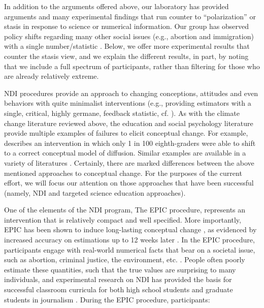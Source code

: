In addition to the arguments offered above, our laboratory has provided
arguments and many experimental findings that run counter to ``polarization'' or
stasis in response to science or numerical information.  Our group has observed
policy shifts regarding many other social issues (e.g., abortion and
immigration) with a single number/statistic
\parencite{garcia_de_osuna_qualitative_2004,munnich_policy_2003,ranney_designing_2008}.
Below, we offer more experimental results that counter the stasis view, and we
explain the different results, in part, by noting that we include a full
spectrum of participants, rather than filtering for those who are already
relatively extreme.


NDI procedures \parencite[introduced by][]{ranney_numerically_2001_fixed} provide an
approach to changing conceptions, attitudes and even behaviors with quite
minimalist interventions (e.g., providing estimators with a single, critical,
highly germane, feedback statistic, cf. \cite{rinne_estimation_2006}). As
with the climate change literature reviewed above, the
education and social psychology literature provide multiple examples of failures
to elicit conceptual change. For example, \textcite{chi_commonsense_2005} describes
an intervention in which only 1 in 100 eighth-graders were able to shift to a
correct conceptual model of diffusion. Similar examples are available in a
variety of literatures \parencite[cf.][]{disessa_what_1998, lord_biased_1979}.
Certainly, there are marked differences between the above mentioned approaches to
conceptual change. For the purposes of the current effort, we will focus our
attention on those approaches that have been successful (namely, NDI and
targeted science education approaches).

One of the elements of the NDI program, The EPIC procedure, represents an
intervention that is relatively compact and well specified. More importantly,
EPIC has been shown to induce long-lasting conceptual change
\parencite[e.g.,][]{ranney_designing_2008}, as evidenced by increased accuracy on estimations
up to 12 weeks later \parencite{munnich_longevities_2005}.  In the EPIC procedure,
participants engage with real-world numerical facts that bear on a societal
issue, such as abortion, criminal justice, the environment, etc.
\parencite[e.g.,][]{garcia_de_osuna_qualitative_2004,munnich_policy_2003}.  
People often poorly
estimate these quantities, such that the true values are surprising to many
individuals, and experimental research on NDI has provided the basis for
successful classroom curricula for both high school students and graduate
students in journalism
\parencite{munnich_numerically-driven_2004,ranney_designing_2008}.  During the EPIC
procedure, participants:

